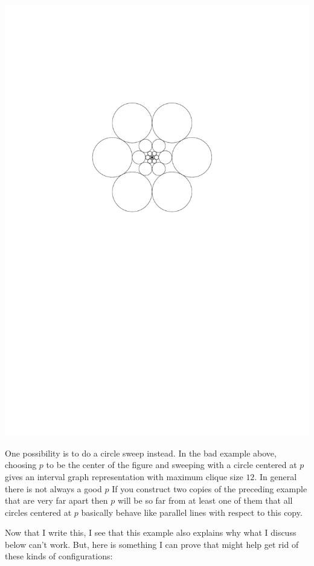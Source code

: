 \documentclass{patmorin}
\begin{document}
\begin{center}
  \includegraphics{figs/spider}
\end{center}

One possibility is to do a circle sweep instead. In the bad example above, choosing $p$ to be the center of the figure and sweeping with a circle centered at $p$ gives an interval graph representation with maximum clique size $12$.  In general there is not always a good $p$  If you construct two copies of the preceding example that are very far apart then $p$ will be so far from at least one of them that all circles centered at $p$ basically behave like parallel lines with respect to this copy.

Now that I write this, I see that this example also explains why what I discuss below can't work.  But, here is something I can prove that might help get rid of these kinds of configurations:
\end{document}
